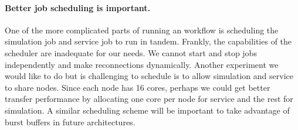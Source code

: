 \paragraph{Better job scheduling is important.} One of the more complicated
parts of running an \intransit workflow is scheduling the simulation job
and service job to run in tandem.  Frankly, the capabilities of the
scheduler are inadequate for our needs.  We cannot start and stop jobs
independently and make reconnections dynamically.  Another experiment we
would like to do but is challenging to schedule is to allow simulation and
service to share nodes.  Since each node has 16 cores, perhaps we could get
better transfer performance by allocating one core per node for service and
the rest for simulation.  A similar scheduling scheme will be important to
take advantage of burst buffers in future architectures.


